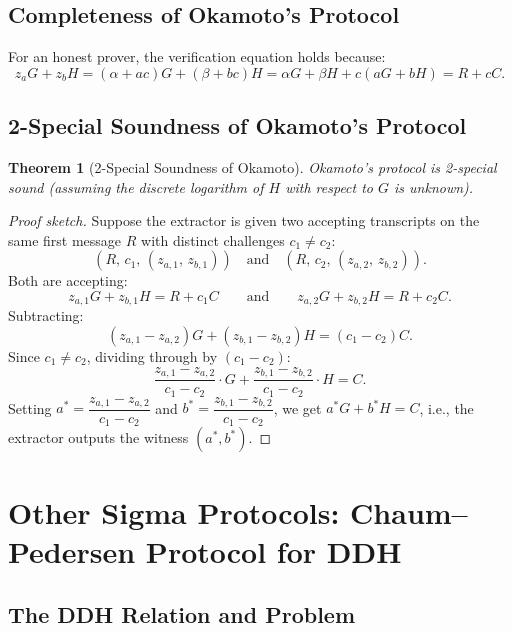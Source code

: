\documentclass[11pt]{article}
\theoremstyle{plain}
\newtheorem{theorem}{Theorem}[section]
\theoremstyle{definition}
\begin{document}
\subsection{Completeness of Okamoto's Protocol}

For an honest prover, the verification equation holds because:
\[
  z_a G + z_b H
  = (\alpha + ac)G + (\beta + bc)H
  = \alpha G + \beta H + c(aG + bH)
  = R + cC.
\]

\subsection{2-Special Soundness of Okamoto's Protocol}

\begin{theorem}[2-Special Soundness of Okamoto]
Okamoto's protocol is 2-special sound (assuming the discrete logarithm of $H$ with respect to $G$ is unknown).
\end{theorem}

\begin{proof}[Proof sketch]
Suppose the extractor is given two accepting transcripts on the same first message $R$ with distinct challenges $c_1 \neq c_2$:
\[
  (R,\, c_1,\, (z_{a,1},\, z_{b,1})) \quad \text{and} \quad (R,\, c_2,\, (z_{a,2},\, z_{b,2})).
\]
Both are accepting:
\[
  z_{a,1}G + z_{b,1}H = R + c_1 C
  \qquad\text{and}\qquad
  z_{a,2}G + z_{b,2}H = R + c_2 C.
\]
Subtracting:
\[
  (z_{a,1} - z_{a,2})G + (z_{b,1} - z_{b,2})H = (c_1 - c_2)C.
\]
Since $c_1 \neq c_2$, dividing through by $(c_1 - c_2)$:
\[
  \frac{z_{a,1} - z_{a,2}}{c_1 - c_2}\cdot G + \frac{z_{b,1} - z_{b,2}}{c_1 - c_2}\cdot H = C.
\]
Setting $a^* = \dfrac{z_{a,1} - z_{a,2}}{c_1 - c_2}$ and $b^* = \dfrac{z_{b,1} - z_{b,2}}{c_1 - c_2}$, we get $a^*G + b^*H = C$, i.e., the extractor outputs the witness $(a^*, b^*)$.
\end{proof}

\section{Other Sigma Protocols: Chaum--Pedersen Protocol for DDH}

\subsection{The DDH Relation and Problem}
\end{document}
